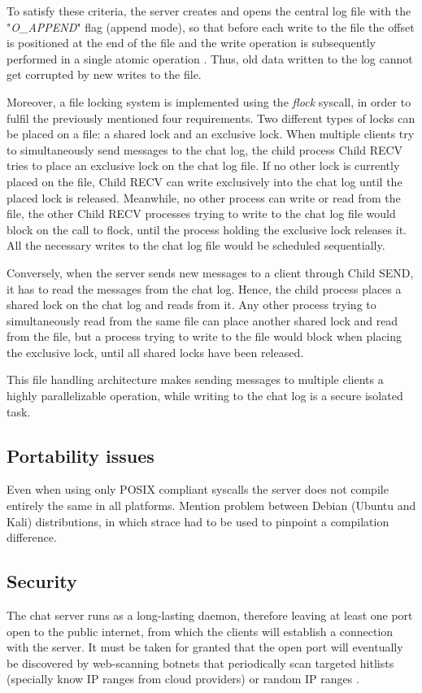 To satisfy these criteria, the server creates and opens the central log file with the "\textit{O\_APPEND}" flag (append mode), so that before each write to the file the offset is positioned at the end of the file and the write operation is subsequently performed in a single atomic operation \cite{Kerrisk2010}. Thus, old data written to the log cannot get corrupted by new writes to the file.

Moreover, a file locking system is implemented using the \textit{flock} syscall, in order to fulfil the previously mentioned four requirements. Two different types of locks can be placed on a file: a shared lock and an exclusive lock. When multiple clients try to simultaneously send messages to the chat log, the child process Child RECV tries to place an exclusive lock on the chat log file.  If no other lock is currently placed on the file, Child RECV can write exclusively into the chat log until the placed lock is released. Meanwhile, no other process can write or read from the file, the other Child RECV processes trying to write to the chat log file would block on the call to flock, until the process holding the exclusive lock releases it. All the necessary writes to the chat log file would be scheduled sequentially.

Conversely, when the server sends new messages to a client through Child SEND, it has to read the messages from the chat log. Hence, the child process places a shared lock on the chat log and reads from it. Any other process trying to simultaneously read from the same file can place another shared lock and read from the file, but a process trying to write to the file would block when placing the exclusive lock, until all shared locks have been released. 

This file handling architecture makes sending messages to multiple clients a highly parallelizable operation, while writing to the chat log is a secure isolated task.

\subsection{Portability issues}
Even when using only POSIX compliant syscalls the server does not compile entirely the same in all platforms. Mention problem between Debian (Ubuntu and Kali) distributions, in which strace had to be used to pinpoint a compilation difference.

\subsection{Security}
The chat server runs as a long-lasting daemon, therefore leaving at least one port open to the public internet, from which the clients will establish a connection with the server. It must be taken for granted that the open port will eventually be discovered by web-scanning botnets that periodically scan targeted hitlists (specially know IP ranges from cloud providers) or random IP ranges \cite{Mirkovic2004}\cite{Graham}.

